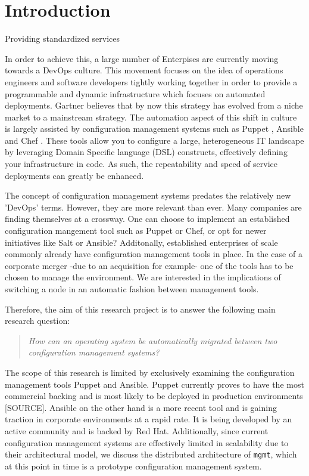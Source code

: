 \section{Introduction}\label{sec:introduction}
Providing standardized services 

In order to achieve this, a large number of Enterpises are currently moving towards a DevOps culture. This movement focuses on the idea of operations engineers and software developers tightly working together in order to provide a programmable and dynamic infrastructure which focuses on automated deployments. Gartner believes that by now this strategy has evolved from a niche market to a mainstream strategy. The automation aspect of this shift in culture is largely assisted by configuration management systems such as Puppet \cite{whatispuppet}, Ansible \cite{whatisansible} and Chef \cite{whatischef}. These tools allow you to configure a large, heterogeneous IT landscape by leveraging Domain Specific language (DSL)  constructs, effectively defining your infrastructure in code. As such, the repeatability and speed of service deployments can greatly be enhanced. 

The concept of configuration management systems predates the relatively new 'DevOps' terms. However, they are more relevant than ever.  Many companies are finding themselves at a crossway. One can choose to implement an established configuration mangement tool such as Puppet or Chef, or opt for newer initiatives like Salt or Ansible? Additonally, established enterprises of scale commonly already have configuration management tools in place. In the case of a corporate merger -due to an acquisition for example- one of the tools has to be chosen to manage the environment. We are interested in the implications of switching a node in an automatic fashion between management tools. 

Therefore, the aim of this research project is to answer the following main research question:

\begin{quote}
\textit{How can an operating system be automatically migrated between two configuration management systems?}
\end{quote}

\noindent
The scope of this research is limited by exclusively examining the configuration management tools Puppet and Ansible. Puppet currently proves to have the most commercial backing and is most likely to be deployed in production environments [SOURCE]. Ansible on the other hand is a more recent tool and is gaining traction in corporate environments at a rapid rate. It is being developed by an active community and is backed by Red Hat. Additionally, since current configuration management systems are effectively limited in scalability due to their architectural model, we discuss the distributed architecture of \texttt{mgmt}, which at this point in time is a prototype configuration management system.
